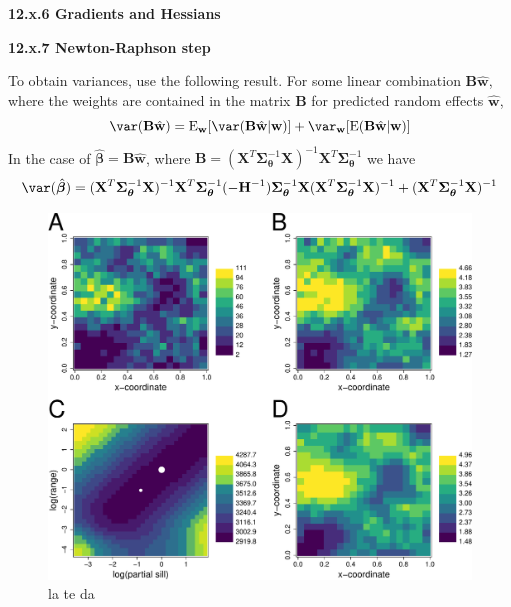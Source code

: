 \documentclass[12pt, titlepage]{article}
\begin{document}
\vspace{.5cm}
{\large \flushleft \textbf{12.x.6 Gradients and Hessians}}
\vspace{.5cm}



\vspace{.5cm}
{\large \flushleft \textbf{12.x.7 Newton-Raphson step}}
\vspace{.5cm}


To obtain variances, use the following result.  For some linear combination $\mathbf{B}\hat{\mathbf{w}}$, where the weights are contained in the matrix $\mathbf{B}$ for predicted random effects $\hat{\mathbf{w}}$, 
$$
\var(\mathbf{B}\hat{\mathbf{w}}) = \textrm{E}_{\mathbf{w}}[\var(\mathbf{B}\hat{\mathbf{w}}|\mathbf{w})] + \var_{\mathbf{w}}[\textrm{E}(\mathbf{B}\hat{\mathbf{w}}|\mathbf{w})]
$$
In the case of $\hat{\boldsymbol{\beta}} = \mathbf{B}\hat{\mathbf{w}}$, where $\mathbf{B} = (\mathbf{X}^{T}\boldsymbol{\Sigma}_{\boldsymbol{\theta}}^{-1}\mathbf{X})^{-1}\mathbf{X}^{T}\boldsymbol{\Sigma}_{\boldsymbol{\theta}}^{-1}$ we have
$$
\var(\hat{\boldsymbol{\beta}}) = (\mathbf{X}^{T}\boldsymbol{\Sigma}_{\boldsymbol{\theta}}^{-1}\mathbf{X})^{-1}\mathbf{X}^{T}\boldsymbol{\Sigma}_{\boldsymbol{\theta}}^{-1}(-\mathbf{H}^{-1})\boldsymbol{\Sigma}_{\boldsymbol{\theta}}^{-1}\mathbf{X}(\mathbf{X}^{T}\boldsymbol{\Sigma}_{\boldsymbol{\theta}}^{-1}\mathbf{X})^{-1} + (\mathbf{X}^{T}\boldsymbol{\Sigma}_{\boldsymbol{\theta}}^{-1}\mathbf{X})^{-1}
$$
\begin{figure}[H]
  \begin{center}
	    \includegraphics[width=.8\linewidth]{figures/sglm_likelihood_estimation}
  \end{center}
  \caption{la te da \label{Fig:sglm_likelihood_estimation}}
\end{figure}
\end{document}
